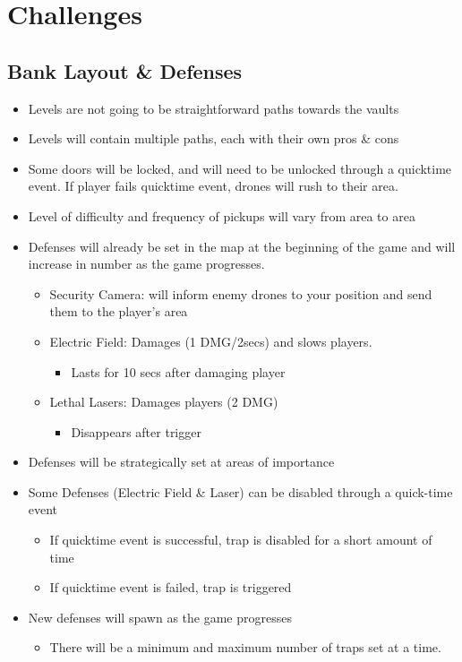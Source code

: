 \documentclass[10pt]{report}
\begin{document}
\section{Challenges}    

\subsection{Bank Layout \& Defenses}

\begin{itemize}
    \item Levels are not going to be straightforward paths towards the vaults
    \item Levels will contain multiple paths, each with their own pros \& cons
    \item Some doors will be locked, and will need to be unlocked through a quicktime event. If player fails quicktime event, drones will rush to their area.
    \item Level of difficulty and frequency of pickups will vary from area to area
    \item Defenses will already be set in the map at the beginning of the game and will increase in number as the game progresses.
    \begin{itemize}
        \item Security Camera: will inform enemy drones to your position and send them to the player’s area
        \item Electric Field: Damages (1 DMG/2secs)  and slows players.
        \begin{itemize}
            \item Lasts for 10 secs after damaging player
        \end{itemize}
        \item Lethal Lasers: Damages players (2 DMG)
        \begin{itemize}
            \item Disappears after trigger
        \end{itemize}
    \end{itemize}
    \item Defenses will be strategically set at areas of importance
    \item Some Defenses (Electric Field \& Laser) can be disabled through a quick-time event
    \begin{itemize}
        \item If quicktime event is successful, trap is disabled for a short amount of time
        \item If quicktime event is failed, trap is triggered
    \end{itemize}
    \item New defenses will spawn as the game progresses
    \begin{itemize}
        \item There will be a minimum and maximum number of traps set at a time.
    \end{itemize}
\end{itemize}
\end{document}
